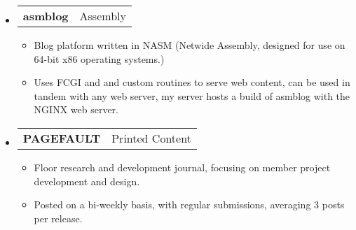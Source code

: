 \documentclass[letterpaper,11pt]{article}
\makeatletter
\newcommand{\restwosubheading}[2]{
\begin{tabular*}{6.5in}{l@{\extracolsep{\fill}}r}
		\textbf{#1} & #2 \\
\end{tabular*}\vspace{-6pt}}
\makeatother
\begin{document}
{\begin{itemize}
\begin{itemize}
			\end{itemize}
		\item		
		\restwosubheading{asmblog}{Assembly}
			\begin{itemize}
				\item{Blog platform written in NASM (Netwide Assembly, designed for use on 64-bit x86 operating systems.)}
				\item{Uses FCGI and and custom routines to serve web content, can be used in tandem with any web server, my server hosts a build of asmblog with the NGINX web server.}
			\end{itemize}
		\item
		\restwosubheading{PAGEFAULT}{Printed Content}
			\begin{itemize}
				\item{Floor research and development journal, focusing on member project development and design.}
				\item{Posted on a bi-weekly basis, with regular submissions, averaging 3 posts per release.}
			\end{itemize}
	\end{itemize}
}

\end{document}
